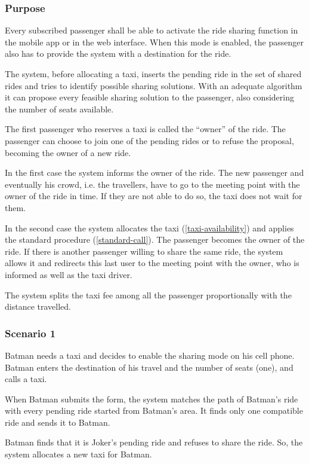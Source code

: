 \label{ride-sharing}
\subsubsection{Purpose}

Every subscribed passenger shall be able to activate the ride sharing function in the mobile app or in the web interface. When this mode is enabled, the passenger also has to provide the system with a destination for the ride.

The system, before allocating a taxi, inserts the pending ride in the set of shared rides and tries to identify possible sharing solutions.
With an adequate algorithm it can propose every feasible sharing solution to the passenger, also considering the number of seats available.

The first passenger who reserves a taxi is called the ``owner'' of the ride.
The passenger can choose to join one of the pending rides or to refuse the proposal, becoming the owner of a new ride.

In the first case the system informs the owner of the ride. The new passenger and eventually his crowd, i.e. the travellers, have to go to the meeting point with the owner of the ride in time. If they are not able to do so, the taxi does not wait for them.

In the second case the system allocates the taxi (\autoref{taxi-availability}) and applies the standard procedure (\autoref{standard-call}).  The passenger becomes the owner of the ride.
If there is another passenger willing to share the same ride, the system allows it and redirects this last user to the meeting point with the owner, who is informed as well as the taxi driver.

The system splits the taxi fee among all the passenger proportionally with the distance travelled.

\subsubsection{Scenario 1}
Batman needs a taxi and decides to enable the sharing mode on his cell phone. Batman enters the destination of his travel and the number of seats (one), and calls a taxi.

When Batman submits the form, the system matches the path of Batman's ride with every pending ride started from Batman's area. It finds only one compatible ride and sends it to Batman.

Batman finds that it is Joker's pending ride and refuses to share the ride.
So, the system allocates a new taxi for Batman.

